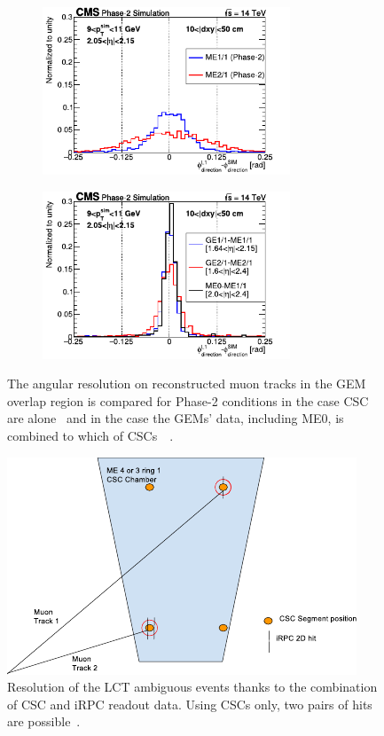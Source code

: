 	\begin{figure}[H]
		\begin{subfigure}{0.5\linewidth}
			\centering
			\includegraphics[height=5cm]{fig/chapt4/CSC-angular-res.pdf}
			\caption{\label{fig:CSC-GEM-res:A}}
		\end{subfigure}
		\begin{subfigure}{0.5\linewidth}
			\centering
			\includegraphics[height=5cm]{fig/chapt4/GEM-angular-res.pdf}
			\caption{\label{fig:CSC-GEM-res:B}}
		\end{subfigure}
		\caption{\label{fig:CSC-GEM-res} The angular resolution on reconstructed muon tracks in the GEM overlap region  is compared for Phase-2 conditions in the case CSC are alone~ and in the case the GEMs' data, including ME0, is combined to which of CSCs~~\cite{PHASEIITP}.}
	\end{figure}

	\begin{figure}[H]
		\centering
		\includegraphics[width=.8\linewidth]{fig/chapt4/CSC-LCT-ambiguity.pdf}
		\caption{\label{fig:LCT-ambiguity} Resolution of the LCT ambiguous events thanks to the combination of CSC and iRPC readout data. Using CSCs only, two pairs of hits are possible~\cite{PHASEIITP}.}
	\end{figure}

